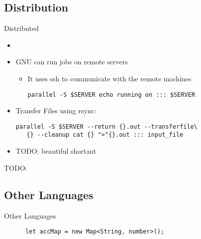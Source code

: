 \subsection{Distribution}
{
\begin{frame}[fragile]{Distributed}
\begin{itemize}[<+(1)->]
   \itemsep6pt
   \item {}
   \item GNU \LogoParallel can run jobs on remote servers \begin{itemize}
      \item It uses ssh to communicate with the remote machines
      \begin{verbatim}
parallel -S $SERVER echo running on ::: $SERVER
      \end{verbatim}
   \end{itemize}
   \item Transfer Files using rsync:
   \begin{verbatim}
parallel -S $SERVER --return {}.out --transferfile\
   {} --cleanup cat {} ">"{}.out ::: input_file
   \end{verbatim}
   \item TODO: beautiful shortant
\end{itemize}
TODO:
\end{frame}
\subsection{Other Languages}
\begin{frame}[fragile]{Other Languages}
   \begin{verbatim}
      let accMap = new Map<String, number>();


\end{verbatim}
\end{frame}}
